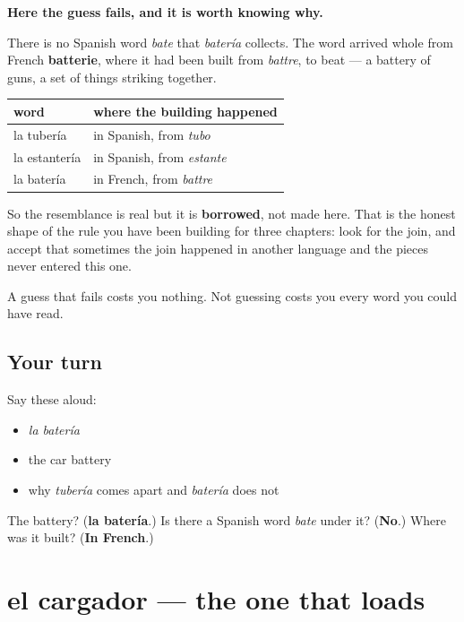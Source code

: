 \begin{cousinweb}
\textbf{Here the guess fails, and it is worth knowing why.}

There is no Spanish word \emph{bate} that \emph{batería} collects. The word arrived whole from French \textbf{batterie}, where it had been built from \emph{battre}, to beat — a battery of guns, a set of things striking together.

\noindent
\begin{tabularx}{\linewidth}{@{}>{\raggedright\arraybackslash}X>{\raggedright\arraybackslash}X@{}}
\toprule
\textbf{word} & \textbf{where the building happened} \\
\midrule
la tubería & in Spanish, from \emph{tubo} \\
la estantería & in Spanish, from \emph{estante} \\
la batería & in French, from \emph{battre} \\
\bottomrule
\end{tabularx}

So the resemblance is real but it is \textbf{borrowed}, not made here. That is the honest shape of the rule you have been building for three chapters: look for the join, and accept that sometimes the join happened in another language and the pieces never entered this one.

A guess that fails costs you nothing. Not guessing costs you every word you could have read.
\end{cousinweb}

\subsection*{Your turn}
Say these aloud:

\begin{itemize}
\raggedright
  \item \emph{la batería}
  \item the car battery
  \item why \emph{tubería} comes apart and \emph{batería} does not
\end{itemize}

\begin{tcolorbox}[breakable,colback=teal!4,colframe=teal!35!black,title={Before you move on}]
The battery? (\textbf{la batería}.) Is there a Spanish word \emph{bate} under it? (\textbf{No}.) Where was it built? (\textbf{In French}.)
\end{tcolorbox}
\section[el cargador]{el cargador — the one that loads}

